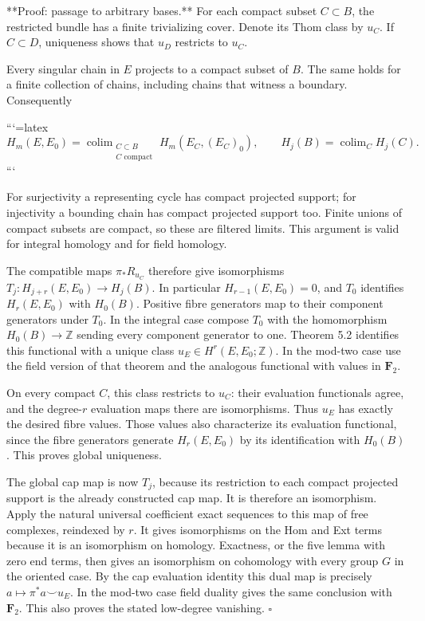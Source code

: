 \begin{theorem}
**Proof: passage to arbitrary bases.** For each compact subset \(C\subset B\), the restricted bundle has a finite trivializing cover. Denote its Thom class by \(u_C\). If \(C\subset D\), uniqueness shows that \(u_D\) restricts to \(u_C\).

Every singular chain in \(E\) projects to a compact subset of \(B\). The same holds for a finite collection of chains, including chains that witness a boundary. Consequently



```{=latex}
\[
H_m(E,E_0)=\mathop{\mathrm{colim}}_{\substack{C\subset B\\ C\text{ compact}}}
H_m(E_C,(E_C)_0),
\qquad
H_j(B)=\mathop{\mathrm{colim}}_C H_j(C).
\]
```



For surjectivity a representing cycle has compact projected support; for injectivity a bounding chain has compact projected support too. Finite unions of compact subsets are compact, so these are filtered limits. This argument is valid for integral homology and for field homology.

The compatible maps \(\pi_*R_{u_C}\) therefore give isomorphisms
\(T_j:H_{j+r}(E,E_0)\to H_j(B)\).
In particular \(H_{r-1}(E,E_0)=0\), and \(T_0\) identifies \(H_r(E,E_0)\) with \(H_0(B)\). Positive fibre generators map to their component generators under \(T_0\). In the integral case compose \(T_0\) with the homomorphism \(H_0(B)\to\mathbb Z\) sending every component generator to one. Theorem 5.2 identifies this functional with a unique class \(u_E\in H^r(E,E_0;\mathbb Z)\). In the mod-two case use the field version of that theorem and the analogous functional with values in \(\mathbf F_2\).

On every compact \(C\), this class restricts to \(u_C\): their evaluation functionals agree, and the degree-\(r\) evaluation maps there are isomorphisms. Thus \(u_E\) has exactly the desired fibre values. Those values also characterize its evaluation functional, since the fibre generators generate \(H_r(E,E_0)\) by its identification with \(H_0(B)\). This proves global uniqueness.

The global cap map is now \(T_j\), because its restriction to each compact projected support is the already constructed cap map. It is therefore an isomorphism. Apply the natural universal coefficient exact sequences to this map of free complexes, reindexed by \(r\). It gives isomorphisms on the Hom and Ext terms because it is an isomorphism on homology. Exactness, or the five lemma with zero end terms, then gives an isomorphism on cohomology with every group \(G\) in the oriented case. By the cap evaluation identity this dual map is precisely \(a\mapsto\pi^*a\smile u_E\). In the mod-two case field duality gives the same conclusion with \(\mathbf F_2\). This also proves the stated low-degree vanishing. \(\square\)


\end{theorem}
